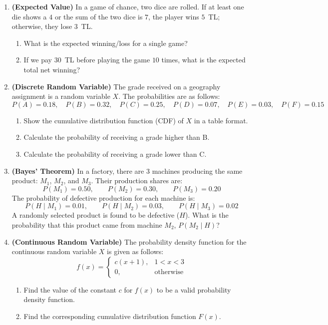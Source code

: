 \documentclass[12pt,a4paper]{article}
\begin{document}
\begin{enumerate}



\item \textbf{(Expected Value)} In a game of chance, two dice are rolled. If at least one die shows a $4$ or the sum of the two dice is $7$, the player wins $5$~TL; otherwise, they lose $3$~TL.
\begin{enumerate}
\item What is the expected winning/loss for a single game?
\item If we pay $30$~TL before playing the game $10$ times, what is the expected total net winning?
\end{enumerate}

\vspace{0.5cm}

\item \textbf{(Discrete Random Variable)} The grade received on a geography assignment is a random variable $X$. The probabilities are as follows:
\[
P(A)=0.18,\quad 
P(B)=0.32,\quad 
P(C)=0.25,\quad 
P(D)=0.07,\quad 
P(E)=0.03,\quad 
P(F)=0.15
\]
\begin{enumerate}
\item Show the cumulative distribution function (CDF) of $X$ in a table format.
\item Calculate the probability of receiving a grade higher than B.
\item Calculate the probability of receiving a grade lower than C.
\end{enumerate}

\vspace{0.5cm}

\item \textbf{(Bayes' Theorem)} In a factory, there are 3 machines producing the same product: $M_1$, $M_2$, and $M_3$. Their production shares are:
\[
P(M_1)=0.50,\qquad
P(M_2)=0.30,\qquad
P(M_3)=0.20
\]
The probability of defective production for each machine is:
\[
P(H\mid M_1)=0.01,\qquad
P(H\mid M_2)=0.03,\qquad
P(H\mid M_3)=0.02
\]
A randomly selected product is found to be defective ($H$). What is the probability that this product came from machine $M_2$, $P(M_2\mid H)$?

\newpage

\item \textbf{(Continuous Random Variable)} The probability density function for the continuous random variable $X$ is given as follows:
\[
f(x)=
\begin{cases}
c(x+1), & 1<x<3 \\
0, & \text{otherwise}
\end{cases}
\]
\begin{enumerate}
\item Find the value of the constant $c$ for $f(x)$ to be a valid probability density function.
\item Find the corresponding cumulative distribution function $F(x)$.
\end{enumerate}


\end{enumerate}
\end{document}
